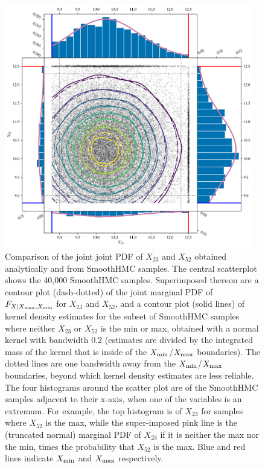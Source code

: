 \documentclass[12pt]{article}
\begin{document}
\begin{figure}[tbp]
\centering
\includegraphics[width=0.97\textwidth,height=0.7\textheight,keepaspectratio]{../figures/toy_joint.png}
\caption{\label{fig:toy_joint}
Comparison of the joint joint PDF of \(X_{23}\) and \(X_{52}\)
obtained analytically and from SmoothHMC samples.
The central scatterplot shows the 40,000 SmoothHMC samples.
Superimposed thereon are a contour plot (dash-dotted) of the joint marginal PDF of \(F_{X \mid X_{\max},X_{\min}}\) for \(X_{23}\) and \(X_{52}\),
and a contour plot (solid lines) of kernel density estimates for the subset of SmoothHMC samples where neither \(X_{23}\) or \(X_{52}\) is the min or max,
obtained with a normal kernel with bandwidth \(0.2\)
(estimates are divided by the integrated mass of the kernel that is inside of the \(X_{\min}\)/\(X_{\max}\) boundaries).
The dotted lines are one bandwidth away from the \(X_{\min}\)/\(X_{\max}\) boundaries, beyond which kernel density estimates are less reliable.
The four histograms around the scatter plot are of the SmoothHMC samples adjacent to their x-axis, when one of the variables is an extremum.
For example, the top histogram is of \(X_{23}\) for samples where \(X_{52}\) is the max, 
while the super-imposed pink line is the (truncated normal) marginal PDF of \(X_{23}\) if it is neither the max nor the min,
times the probability that \(X_{52}\) is the max.
Blue and red lines indicate \(X_{\min}\) and \(X_{\max}\) respectively.
}
\end{figure}
    
\end{document}

